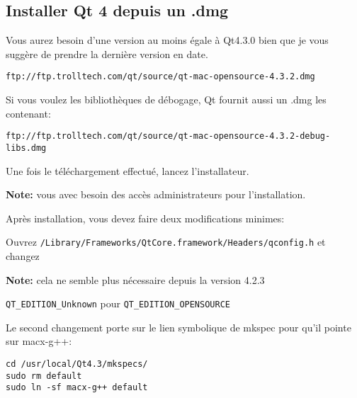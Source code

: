 \subsection{Installer Qt 4 depuis un .dmg}
Vous aurez besoin d'une version au moins égale à Qt4.3.0 bien que je vous suggère de prendre la dernière version en date.

\begin{verbatim}
ftp://ftp.trolltech.com/qt/source/qt-mac-opensource-4.3.2.dmg
\end{verbatim}

Si vous voulez les bibliothèques de débogage, Qt fournit aussi un .dmg les contenant:

\begin{verbatim}
ftp://ftp.trolltech.com/qt/source/qt-mac-opensource-4.3.2-debug-libs.dmg
\end{verbatim}

Une fois le téléchargement effectué, lancez l'installateur.

% 
% 
% 
% 
% 
% 

\textbf{Note:} vous avec besoin des accès administrateurs pour l'installation.

Après installation, vous devez faire deux modifications minimes:

Ouvrez \texttt{/Library/Frameworks/QtCore.framework/Headers/qconfig.h} et changez

\textbf{Note:} cela ne semble plus nécessaire depuis la version 4.2.3

\texttt{QT\_EDITION\_Unknown} pour \texttt{QT\_EDITION\_OPENSOURCE}

Le second changement porte sur le lien symbolique de mkspec pour qu'il pointe sur macx-g++:

\begin{verbatim}
cd /usr/local/Qt4.3/mkspecs/ 
sudo rm default 
sudo ln -sf macx-g++ default
\end{verbatim}

